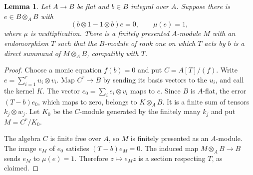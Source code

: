 \documentclass[11pt]{article}
\newtheorem{lemma}[theorem]{Lemma}
\theoremstyle{definition}\newtheorem{definition}[theorem]{Definition}
\theoremstyle{remark}\newtheorem{remark}[theorem]{Remark}
\begin{document}
\begin{lemma}\label{lem:finite-module}
Let $A\to B$ be flat and $b\in B$ integral over $A$. Suppose there is $e\in B\otimes_A B$ with
\[
 (b\otimes1-1\otimes b)e=0,\qquad \mu(e)=1,
\]
where $\mu$ is multiplication. There is a finitely presented $A$-module $M$ with an endomorphism $T$ such that the $B$-module of rank one on which $T$ acts by $b$ is a direct summand of $M\otimes_A B$, compatibly with $T$.
\end{lemma}
\begin{proof}
Choose a monic equation $f(b)=0$ and put $C=A[T]/(f)$. Write $e=\sum_{i=1}^r u_i\otimes v_i$. Map $C^r\to B$ by sending its basis vectors to the $u_i$, and call the kernel $K$. The vector $e_0=\sum_i e_i\otimes v_i$ maps to $e$. Since $B$ is $A$-flat, the error $(T-b)e_0$, which maps to zero, belongs to $K\otimes_A B$. It is a finite sum of tensors $k_j\otimes w_j$. Let $K_0$ be the $C$-module generated by the finitely many $k_j$ and put $M=C^r/K_0$.

The algebra $C$ is finite free over $A$, so $M$ is finitely presented as an $A$-module. The image $e_M$ of $e_0$ satisfies $(T-b)e_M=0$. The induced map $M\otimes_A B\to B$ sends $e_M$ to $\mu(e)=1$. Therefore $z\mapsto e_Mz$ is a section respecting $T$, as claimed.
\end{proof}
\end{document}
